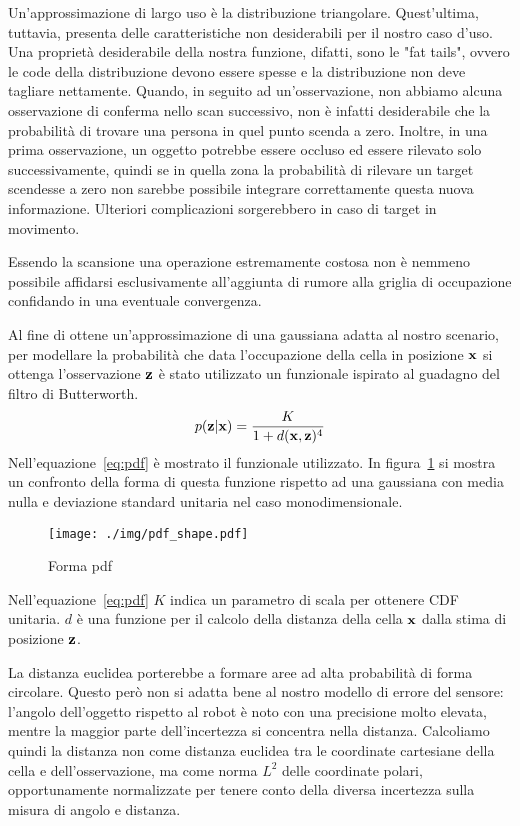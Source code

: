 \documentclass[10pt]{beamer}
\begin{document}
	Un'approssimazione di largo uso è la distribuzione triangolare.
	Quest'ultima, tuttavia, presenta delle caratteristiche non desiderabili per
	il nostro caso d'uso. Una proprietà desiderabile della nostra funzione,
	difatti, sono le "fat tails", ovvero le code della distribuzione devono
	essere spesse e la distribuzione non deve tagliare nettamente. Quando, in
	seguito ad un'osservazione, non abbiamo alcuna osservazione di conferma
	nello scan successivo, non è infatti desiderabile che la probabilità di
	trovare una persona in quel punto scenda a zero. Inoltre, in una prima
	osservazione, un oggetto potrebbe essere occluso ed essere rilevato solo
	successivamente, quindi se in quella zona la probabilità di rilevare un
	target scendesse a zero non sarebbe possibile integrare correttamente
	questa nuova informazione. Ulteriori complicazioni sorgerebbero in caso di
	target in movimento.
	
	Essendo la scansione una operazione estremamente costosa non è nemmeno
	possibile affidarsi esclusivamente all'aggiunta di rumore alla griglia di
	occupazione confidando in una eventuale convergenza.

	Al fine di ottene un'approssimazione di una gaussiana adatta al
	nostro scenario, per modellare la probabilità che data l'occupazione della
	cella in posizione $ {\bf x} $ si ottenga l'osservazione $ {\bf z} $ è
	stato utilizzato un funzionale ispirato al guadagno del filtro di
	Butterworth.
	\begin{equation}\label{eq:pdf}
		p({\bf z}|{\bf x}) = \frac	{K}
		{1 + d({\bf x},{\bf z})^4 } 
	\end{equation}
	Nell'equazione~\ref{eq:pdf} è mostrato il funzionale utilizzato. In
	figura~\ref{fig:pdf_shape} si mostra un confronto della forma di questa
	funzione rispetto ad una gaussiana con media nulla e deviazione standard
	unitaria nel caso monodimensionale.
	
	\begin{figure}[H]
		\centering
		\texttt{[image: ./img/pdf\_shape.pdf]}
		\caption{Forma pdf}
		\label{fig:pdf_shape}
	\end{figure}

	Nell'equazione~\ref{eq:pdf} $K$ indica un parametro di scala per ottenere
	CDF unitaria. $d$ è una funzione per il calcolo della distanza della cella
	$ {\bf x} $ dalla stima di posizione $ {\bf z} $.

	La distanza euclidea porterebbe a formare aree ad alta probabilità di forma
	circolare. Questo però non si adatta bene al nostro modello di errore del
	sensore: l'angolo dell'oggetto rispetto al robot è noto con una precisione
	molto elevata, mentre la maggior parte dell'incertezza si concentra nella
	distanza. Calcoliamo quindi la distanza non come distanza euclidea tra le
	coordinate cartesiane della cella e dell'osservazione, ma come norma $ L^2
	$ delle coordinate polari, opportunamente normalizzate per tenere conto
	della diversa incertezza sulla misura di angolo e distanza.
\end{document}
